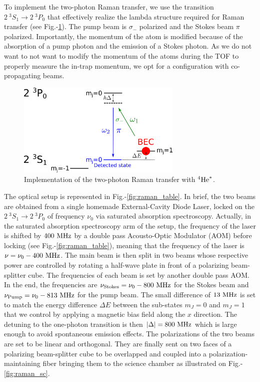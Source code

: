 To implement the two-photon Raman transfer, we use the transition $2 \ ^3 S_1 \rightarrow 2 \ ^3 P_0$ that effectively realize the lambda structure required for Raman transfer (see Fig.-\ref{fig:raman_He}). The pump beam is $\sigma_-$ polarized and the Stokes beam $\pi$ polarized. Importantly, the momentum of the atom is modified because of the absorption of a pump photon and the emission of a Stokes photon. As we do not want to not want to modify the momentum of the atoms during the TOF to properly measure the in-trap momentum, we opt for a configuration with co-propagating beams.

\begin{figure}
    \centering
    \includegraphics[width=0.7\textwidth]{Fig/Chapter3/raman_exp.png}
    \caption{Implementation of the two-photon Raman transfer with $^4 \rm{He}^*$.}
    \label{fig:raman_He}
\end{figure}

The optical setup is represented in Fig.-\ref{fig:raman_table}. In brief, the two beams are obtained from a single homemade External-Cavity Diode Laser, locked on the $2 \ ^3 S_1 \rightarrow 2 \ ^3 P_0$ of frequency $\nu_0$ via saturated absorption spectroscopy. Actually, in the saturated absorption spectroscopy arm of the setup, the frequency of the laser is shifted by $400 \ \rm{MHz}$ by a double pass Acousto-Optic Modulator (AOM) before locking (see Fig.-\ref{fig:raman_table}), meaning that the frequency of the laser is $\nu = \nu_0 - 400 \ \rm{MHz}$. The main beam is then split in two beams whose respective power are controlled by rotating a half-wave plate in front of a polarizing beam-splitter cube. The frequencies of each beam is set by another double pass AOM. In the end, the frequencies are $\nu_{\rm{Stokes}} = \nu_0 - 800 \ \rm{MHz}$ for the Stokes beam and $\nu_{\rm{Pump}} = \nu_0 - 813 \ \rm{MHz}$ for the pump beam. The small difference of $13 \ \rm{MHz}$ is set to match the energy difference $\Delta E$ between the sub-states $m_J=0$ and $m_J=1$ that we control by applying a magnetic bias field along the $x$ direction. The detuning to the one-photon transition is then $|\Delta|=800 \ \rm{MHz}$ which is large enough to avoid spontaneous emission effects. The polarizations of the two beams are set to be linear and orthogonal. They are finally sent on two faces of a polarizing beam-splitter cube to be overlapped and coupled into a polarization-maintaining fiber bringing them to the science chamber as illustrated on Fig.-\ref{fig:raman_sc}.

